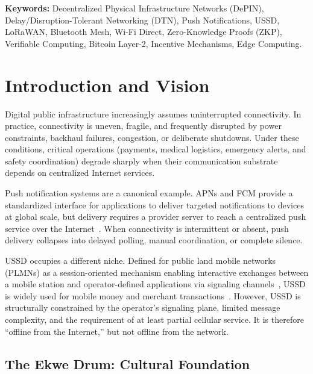 \documentclass[11pt,a4paper]{article}
\begin{document}
\vspace{0.5cm}
\noindent\textbf{Keywords:} Decentralized Physical Infrastructure Networks (DePIN), Delay/Disruption-Tolerant Networking (DTN), Push Notifications, USSD, LoRaWAN, Bluetooth Mesh, Wi-Fi Direct, Zero-Knowledge Proofs (ZKP), Verifiable Computing, Bitcoin Layer-2, Incentive Mechanisms, Edge Computing.

\newpage
\tableofcontents
\newpage

\section{Introduction and Vision}

Digital public infrastructure increasingly assumes uninterrupted connectivity. In practice, connectivity is uneven, fragile, and frequently disrupted by power constraints, backhaul failures, congestion, or deliberate shutdowns. Under these conditions, critical operations (payments, medical logistics, emergency alerts, and safety coordination) degrade sharply when their communication substrate depends on centralized Internet services.

Push notification systems are a canonical example. APNs and FCM provide a standardized interface for applications to deliver targeted notifications to devices at global scale, but delivery requires a provider server to reach a centralized push service over the Internet~\cite{apns}. When connectivity is intermittent or absent, push delivery collapses into delayed polling, manual coordination, or complete silence.

USSD occupies a different niche. Defined for public land mobile networks (PLMNs) as a session-oriented mechanism enabling interactive exchanges between a mobile station and operator-defined applications via signaling channels~\cite{etsi_ussd_stage1}, USSD is widely used for mobile money and merchant transactions~\cite{gsma_ussd}. However, USSD is structurally constrained by the operator's signaling plane, limited message complexity, and the requirement of at least partial cellular service. It is therefore ``offline from the Internet,'' but not offline from the network.

\subsection{The Ekwe Drum: Cultural Foundation}
\end{document}
